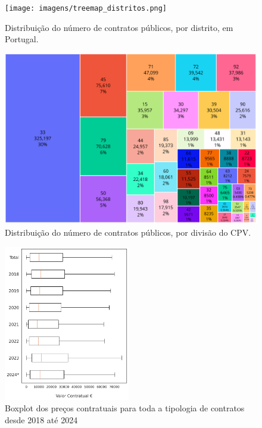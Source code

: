 \clearpage
\vfill
\begin{figure}[H]
	\centering
	\texttt{[image: imagens/treemap\_distritos.png]}
	\caption{Distribuição do número de contratos públicos, por distrito, em Portugal.}
	\label{fig:distritos}
\end{figure}
\vfill 
\begin{figure}[H]
	\centering
	\includegraphics[width=\textwidth]{imagens/treemap_contratos.png}
	\caption{Distribuição do número de contratos públicos, por divisão do CPV.}
	\label{fig:cpvs}
\end{figure}
\vfill
\clearpage


\begin{figure}
	\centering
	\includegraphics[width=0.49\textwidth]{imagens/precoscontr_stat.png}
	\caption{Boxplot dos preços contratuais para toda a tipologia de contratos desde 2018 até 2024}
	\label{fig:precotodos}
\end{figure}


